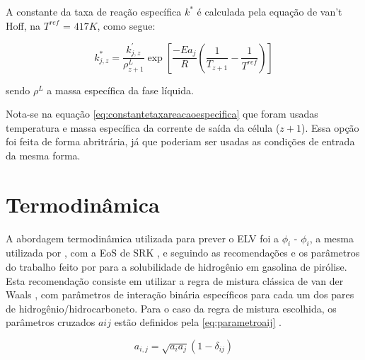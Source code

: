 A constante da taxa de reação específica $k^{*}$ é calculada pela
equação de van't Hoff, na $T^{ref}$ = $417 K$, como segue:

\begin{equation}
k^{*}_{j,z} =
\dfrac{k^{'}_{j,z}}{\rho^{L}_{z+1}}\exp[{\dfrac{-Ea_j}{R}(\dfrac{1}{T_{z+1}}
- \dfrac{1}{T^{ref}})}]
\label{eq:constantetaxareacaoespecifica}
\end{equation}

sendo $\rho^L$ a massa específica da fase líquida.

Nota-se na equação \autoref{eq:constantetaxareacaoespecifica} que foram usadas
temperatura e massa específica da corrente de saída da célula ($z+1$). Essa
opção foi feita de forma abritrária, já que poderiam ser usadas as condições de
entrada da mesma forma.


\section{Termodinâmica} \label{sec:termodinamica}

A abordagem termodinâmica utilizada para prever o ELV foi a $\phi_i$ -
$\phi_i$, a mesma utilizada por , com a EoS de SRK
\cite{Soave1972}, e seguindo as recomendações e os parâmetros do trabalho feito
por  para a solubilidade de hidrogênio em gasolina de
pirólise. Esta recomendação consiste em utilizar a regra de mistura clássica de
van der Waals \cite{VanderWaals1873}, com parâmetros de interação binária
específicos para cada um dos pares de hidrogênio/hidrocarboneto. Para o caso da
regra de mistura escolhida, os parâmetros cruzados $aij$ estão definidos pela
\autoref{eq:parametroaij} \cite{Peng1976,Soave1972}.

\begin{equation}
a_{i,j} = \sqrt{a_ia_j}(1-\delta_{ij})
\label{eq:parametroaij}
\end{equation}

